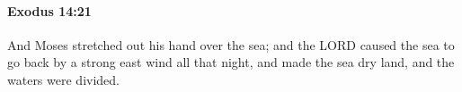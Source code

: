 
		\paragraph{Exodus 14:21} %
			\label{EXODUS-14-21}

			And Moses stretched out his hand over the sea; and the LORD caused the sea to go back by a strong east wind all that night, and made the sea dry land, and the waters were divided.


